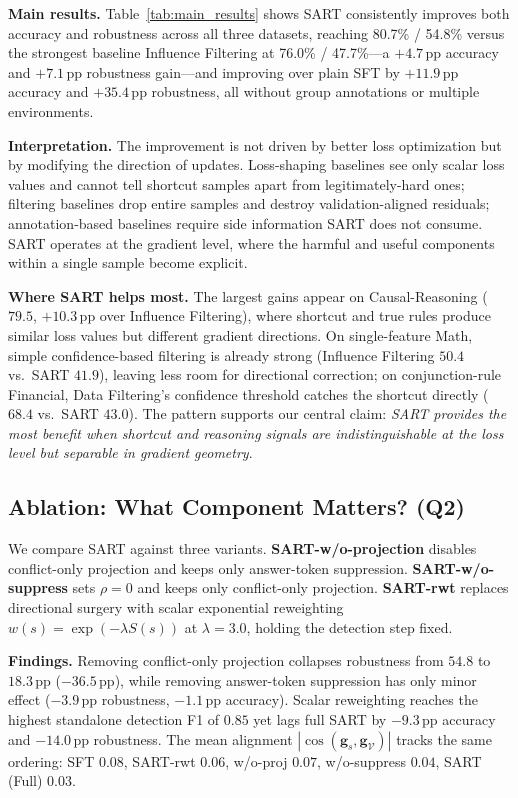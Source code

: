 \textbf{Main results.} Table~\ref{tab:main_results} shows SART consistently improves both accuracy and robustness across all three datasets, reaching 80.7\% / 54.8\% versus the strongest baseline Influence Filtering at 76.0\% / 47.7\%---a $+4.7$\,pp accuracy and $+7.1$\,pp robustness gain---and improving over plain SFT by $+11.9$\,pp accuracy and $+35.4$\,pp robustness, all without group annotations or multiple environments.

\textbf{Interpretation.} The improvement is not driven by better loss optimization but by modifying the direction of updates. Loss-shaping baselines see only scalar loss values and cannot tell shortcut samples apart from legitimately-hard ones; filtering baselines drop entire samples and destroy validation-aligned residuals; annotation-based baselines require side information SART does not consume. SART operates at the gradient level, where the harmful and useful components within a single sample become explicit.

\textbf{Where SART helps most.} The largest gains appear on Causal-Reasoning ($79.5$, $+10.3$\,pp over Influence Filtering), where shortcut and true rules produce similar loss values but different gradient directions. On single-feature Math, simple confidence-based filtering is already strong (Influence Filtering $50.4$ vs.\ SART $41.9$), leaving less room for directional correction; on conjunction-rule Financial, Data Filtering's confidence threshold catches the shortcut directly ($68.4$ vs.\ SART $43.0$). The pattern supports our central claim: \emph{SART provides the most benefit when shortcut and reasoning signals are indistinguishable at the loss level but separable in gradient geometry}.

\subsection{Ablation: What Component Matters? (Q2)}
\label{sec:exp_ablation}

We compare SART against three variants. \textbf{SART-w/o-projection} disables conflict-only projection and keeps only answer-token suppression. \textbf{SART-w/o-suppress} sets $\rho=0$ and keeps only conflict-only projection. \textbf{SART-rwt} replaces directional surgery with scalar exponential reweighting $w(s)=\exp(-\lambda S(s))$ at $\lambda=3.0$, holding the detection step fixed.

\textbf{Findings.} Removing conflict-only projection collapses robustness from $54.8$ to $18.3$\,pp ($-36.5$\,pp), while removing answer-token suppression has only minor effect ($-3.9$\,pp robustness, $-1.1$\,pp accuracy). Scalar reweighting reaches the highest standalone detection F1 of $0.85$ yet lags full SART by $-9.3$\,pp accuracy and $-14.0$\,pp robustness. The mean alignment $|\cos(\mathbf{g}_s,\mathbf{g}_{\mathcal{V}})|$ tracks the same ordering: SFT $0.08$, SART-rwt $0.06$, w/o-proj $0.07$, w/o-suppress $0.04$, SART (Full) $\mathbf{0.03}$.

